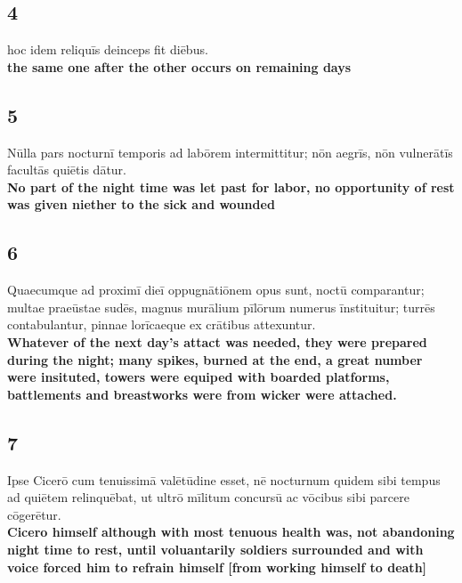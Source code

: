 \documentclass{article}
\begin{document}
\subsection*{4}
hoc idem reliquīs deinceps fit diēbus.\\
\textbf{the same one after the other occurs on remaining days}

\subsection*{5}
Nūlla pars nocturnī temporis ad labōrem intermittitur; nōn aegrīs, nōn vulnerātīs facultās quiētis dātur. \\
\textbf{No part of the night time was let past for labor, no opportunity of rest was given niether to the sick and wounded}


\subsection*{6}
Quaecumque ad proximī dieī oppugnātiōnem opus sunt, noctū comparantur; multae praeūstae sudēs, magnus murālium pīlōrum numerus īnstituitur; turrēs contabulantur, pinnae lorīcaeque ex crātibus attexuntur. \\
\textbf{Whatever of the next day's attact was needed, they were prepared during the night; many spikes, burned at the end, a great number were insituted, towers were equiped with boarded platforms, battlements and breastworks were from wicker were attached.}


\subsection*{7}
Ipse Cicerō cum tenuissimā valētūdine esset, nē nocturnum quidem sibi tempus ad quiētem relinquēbat, ut ultrō mīlitum concursū ac vōcibus sibi parcere cōgerētur.\\
\textbf{Cicero himself although with most tenuous health was, not abandoning night time to rest, until voluantarily soldiers surrounded and with voice forced him to refrain himself [from working himself to death]}
\end{document}
